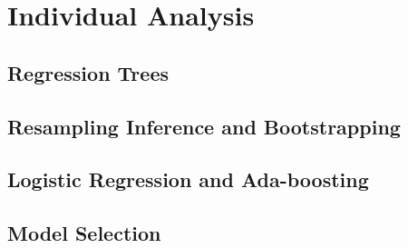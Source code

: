 \documentclass[11pt]{article}
\begin{document}

\section{Individual Analysis}


\subsection{Regression Trees} %


\subsection{Resampling Inference and Bootstrapping} %


\subsection{Logistic Regression and Ada-boosting} %


\subsection{Model Selection} %
\end{document}
